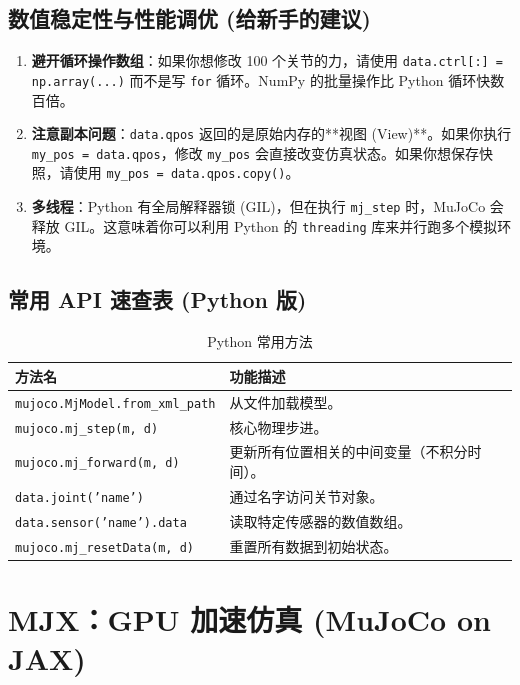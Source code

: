 \documentclass[11pt,a4paper]{book}
\begin{document}
\section{数值稳定性与性能调优 (给新手的建议)}
\begin{enumerate}
    \item \textbf{避开循环操作数组}：如果你想修改 100 个关节的力，请使用 \texttt{data.ctrl[:] = np.array(...)} 而不是写 \texttt{for} 循环。NumPy 的批量操作比 Python 循环快数百倍。
    \item \textbf{注意副本问题}：\texttt{data.qpos} 返回的是原始内存的**视图 (View)**。如果你执行 \texttt{my\_pos = data.qpos}，修改 \texttt{my\_pos} 会直接改变仿真状态。如果你想保存快照，请使用 \texttt{my\_pos = data.qpos.copy()}。
    \item \textbf{多线程}：Python 有全局解释器锁 (GIL)，但在执行 \texttt{mj\_step} 时，MuJoCo 会释放 GIL。这意味着你可以利用 Python 的 \texttt{threading} 库来并行跑多个模拟环境。
\end{enumerate}

\section{常用 API 速查表 (Python 版)}

\begin{longtable}{lp{10cm}}
\caption{Python 常用方法} \\
\toprule
\textbf{方法名} & \textbf{功能描述} \\ \midrule
\texttt{mujoco.MjModel.from\_xml\_path} & 从文件加载模型。 \\
\texttt{mujoco.mj\_step(m, d)} & 核心物理步进。 \\
\texttt{mujoco.mj\_forward(m, d)} & 更新所有位置相关的中间变量（不积分时间）。 \\
\texttt{data.joint('name')} & 通过名字访问关节对象。 \\
\texttt{data.sensor('name').data} & 读取特定传感器的数值数组。 \\
\texttt{mujoco.mj\_resetData(m, d)} & 重置所有数据到初始状态。 \\
\bottomrule
\end{longtable}

\chapter{MJX：GPU 加速仿真 (MuJoCo on JAX)}
\end{document}
